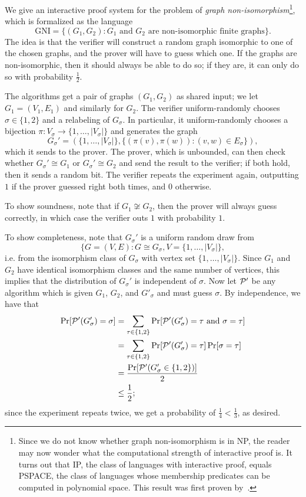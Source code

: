 \begin{ex}
  We give an interactive proof system for the problem of \emph{graph
  non-isomorphism}\footnote{
    Since we do not know whether graph non-isomorphism is in NP, the reader may
    now wonder what the computational strength of interactive proof is. It turns
    out that IP, the class of languages with interactive proof, equals PSPACE,
    the class of languages whose membership predicates can be computed in
    polynomial space. This result was first proven by~\cite{shamir-1992}.
  }, which is formalized as the language \[
    \text{GNI} = \{(G_1,G_2): G_1\text{ and }G_2\text{ are non-isomorphic finite graphs}\}.
  \]
  The idea is that the verifier will construct a random graph isomorphic to one
  of the chosen graphs, and the prover will have to guess which one. If the
  graphs are non-isomorphic, then it should always be able to do so; if they
  are, it can only do so with probability $\frac{1}{2}$.

  The algorithms get a pair of graphs $(G_1,G_2)$ as shared input; we let $G_1 =
  (V_1,E_1)$ and similarly for $G_2$. The verifier uniform-randomly chooses $\sigma\in\{1,2\}$
  and a relabeling of $G_\sigma$. In particular, it uniform-randomly chooses a
  bijection $\pi: V_\sigma\to \{1,\dots,|V_\sigma|\}$ and generates the graph \[
    G_\sigma' = (\{1,\dots,|V_\sigma|\}, \{(\pi(v),\pi(w)): (v,w)\in E_\sigma\}),
  \]
  which it sends to the prover. The prover, which is unbounded, can then check
  whether $G_\sigma'\cong G_1$ or $G_\sigma'\cong G_2$ and send the result to
  the verifier; if both hold, then it sends a random bit. The verifier repeats
  the experiment again, outputting $1$ if the prover guessed right both times,
  and $0$ otherwise.

  To show soundness, note that if $G_1\not\cong G_2$, then the prover will always
  guess correctly, in which case the verifier outs $1$ with probability $1$.

  To show completeness, note that $G_\sigma'$ is a uniform random draw from \[
    \{G = (V,E): G\cong G_\sigma, V = \{1,\dots,|V_\sigma|\},
  \]
  i.e. from the isomorphism class of $G_\sigma$ with vertex set
  $\{1,\dots,|V_\sigma|\}$. Since $G_1$ and $G_2$ have identical isomorphism
  classes and the same number of vertices, this implies that the distribution of
  $G_\sigma'$ is independent of $\sigma$. Now let $\mathcal{P}'$ be any algorithm which
  is given $G_1$, $G_2$, and $G'_\sigma$ and must guess $\sigma$. By
  independence, we have that
  \begin{align*}
    \Pr[\mathcal{P}'(G'_\sigma) = \sigma] &= \sum_{\tau\in\{1,2\}}\Pr[\mathcal{P}'(G'_\sigma) = \tau \text{ and } \sigma = \tau] \\
                                  &= \sum_{\tau\in\{1,2\}}\Pr[\mathcal{P}'(G'_\sigma) = \tau]\Pr[\sigma = \tau] \\
                                  &= \frac{\Pr[\mathcal{P}'(G'_\sigma\in\{1,2\})]}{2} \\
                                  &\leq \frac{1}{2};
  \end{align*}
  since the experiment repeats twice, we get a probability of
  $\frac{1}{4}<\frac{1}{3}$, as desired.
\end{ex}

